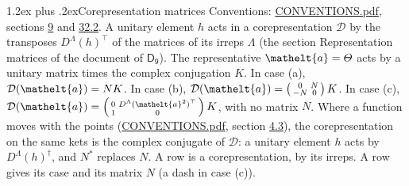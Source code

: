 \documentclass[10pt,a4paper]{article}
\makeatletter
\renewcommand\section{\@startsection{section}{1}{\z@}{-3ex plus -1ex minus -.2ex}%
  {1.2ex plus .2ex}{\normalfont\large\sffamily\bfseries\color{parttitle}}}
\numberwithin{equation}{section}
\newcommand{\eltfont}[1]{{\let\sigma\eltsigma\mathelt{#1}}}
\newcommand{\grp}[1]{\mathsf{#1}}
\newcommand{\elt}[1]{\eltfont{#1}}
\makeatother
\begin{document}
\section{Corepresentation matrices}\label{s:corep_matrices}
Conventions: \href{../../CONVENTIONS.pdf}{CONVENTIONS.pdf}, sections \href{../../../rotation/CONVENTIONS.pdf\#conv.9}{9} and \href{../../CONVENTIONS.pdf\#conv.32.2}{32.2}.
A unitary element $h$ acts in a corepresentation $\mathcal{D}$ by the transposes $D^{\Lambda}(h)^{\top}$ of the matrices of its irreps $\Lambda$ (the section Representation matrices of the document of \href{../../../rotation/data/pdf/D9.pdf}{$\grp{D_{9}}$}). The representative $\elt{a} = \varTheta$ acts by a unitary matrix times the complex conjugation $K$.
In case (a), $\mathcal{D}(\elt{a}) = NK$. In case (b), $\mathcal{D}(\elt{a}) = \left(\begin{smallmatrix} 0 & N \\ -N & 0 \end{smallmatrix}\right) K$. In case (c), $\mathcal{D}(\elt{a}) = \left(\begin{smallmatrix} 0 & D^{\Lambda}(\elt{a}^2)^{\top} \\ 1 & 0 \end{smallmatrix}\right) K$, with no matrix $N$.
Where a function moves with the points (\href{../../CONVENTIONS.pdf}{CONVENTIONS.pdf}, section \href{../../../rotation/CONVENTIONS.pdf\#conv.4.3}{4.3}), the corepresentation on the same kets is the complex conjugate of $\mathcal{D}$: a unitary element $h$ acts by $D^{\Lambda}(h)^{\dagger}$, and $N^{*}$ replaces $N$.
A row is a corepresentation, by its irreps. A row gives its case and its matrix $N$ (a dash in case (c)).
\end{document}
